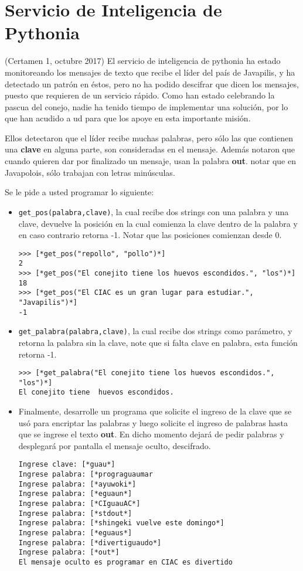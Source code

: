 \section{Servicio de Inteligencia de Pythonia}
(Certamen 1, octubre 2017) El servicio de inteligencia de pythonia ha estado monitoreando los mensajes de texto que recibe el líder del país de Javapilis, y ha detectado un patrón en éstos, pero no ha podido descifrar que dicen los mensajes, puesto que requieren de un servicio rápido. Como han estado celebrando la pascua del conejo, nadie ha tenido tiempo de implementar una solución, por lo que han acudido a ud para que los apoye en esta importante misión.

Ellos detectaron que el líder recibe muchas palabras, pero sólo las que contienen una \textbf{clave} en alguna parte, son consideradas en el mensaje. Además notaron que cuando quieren dar por finalizado un mensaje, usan la palabra \textbf{out}. notar que en Javapolois, sólo trabajan con letras minúsculas.

Se le pide a usted programar lo siguiente:

\begin{itemize} 

\item \texttt{get\_pos(palabra,clave)}, la cual recibe dos strings con una palabra y una clave, devuelve la posición en la cual comienza la clave dentro de la palabra y en caso contrario retorna -1. Notar que las posiciones comienzan desde 0.

\begin{lstlisting}[style=consola]
>>> [*get_pos("repollo", "pollo")*]
2
>>> [*get_pos("El conejito tiene los huevos escondidos.", "los")*]
18
>>> [*get_pos("El CIAC es un gran lugar para estudiar.", "Javapilis")*]
-1
\end{lstlisting}

\item \texttt{get\_palabra(palabra,clave)}, la cual recibe dos strings como parámetro, y retorna la palabra sin la clave, note que si falta clave en palabra, esta función retorna -1.

\begin{lstlisting}[style=consola]
>>> [*get_palabra("El conejito tiene los huevos escondidos.", "los")*]
El conejito tiene  huevos escondidos.
\end{lstlisting}

\item Finalmente, desarrolle un programa que solicite el ingreso de la clave que se usó para encriptar las palabras y luego solicite el ingreso de palabras hasta que se ingrese el texto \textbf{out}. En dicho momento dejará de pedir palabras y desplegará por pantalla el mensaje oculto, descifrado.
\begin{lstlisting}[style=consola]
Ingrese clave: [*guau*]
Ingrese palabra: [*prograguaumar
Ingrese palabra: [*ayuwoki*]
Ingrese palabra: [*eguaun*]
Ingrese palabra: [*CIguauAC*]
Ingrese palabra: [*stdout*]
Ingrese palabra: [*shingeki vuelve este domingo*]
Ingrese palabra: [*eguaus*]
Ingrese palabra: [*divertiguaudo*]
Ingrese palabra: [*out*]
El mensaje oculto es programar en CIAC es divertido
\end{lstlisting}

\end{itemize}
